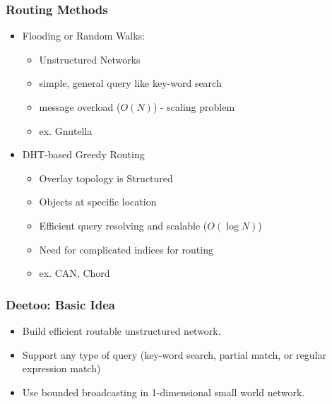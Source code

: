 \documentclass[red]{beamer}
\begin{document}
\begin{frame}
\frametitle{Routing Methods}
\begin{itemize}
\item
Flooding or Random Walks:
\begin{itemize}
\item Unstructured Networks
\item simple, general query like key-word search
\item message overload ($O(N)$) - scaling problem
\item ex. Gnutella
\end{itemize}
\item
DHT-based Greedy Routing
\begin{itemize}
\item Overlay topology is Structured
\item Objects at specific location
\item Efficient query resolving and scalable ($O(\log{N})$)
\item Need for complicated indices for routing
\item ex. CAN, Chord
\end{itemize}
\end{itemize}

\end{frame}


\begin{frame}
\frametitle{Deetoo: Basic Idea}
\begin{itemize}
\item
Build efficient routable unstructured network.
\item
Support any type of query (key-word search, partial match, or regular expression match)
\item
Use bounded broadcasting in 1-dimensional small world network.
\end{itemize}
\end{frame}
\end{document}
